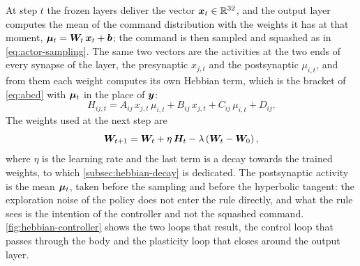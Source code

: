 At step $t$ the frozen layers deliver the vector $\bm{x}_t \in \mathbb{R}^{32}$, and the output layer computes the mean of the command distribution with the weights it has at that moment, $\bm{\mu}_t = \bm{W}_t\, \bm{x}_t + \bm{b}$; the command is then sampled and squashed as in \eqref{eq:actor-sampling}. The same two vectors are the activities at the two ends of every synapse of the layer, the presynaptic $x_{j,t}$ and the postsynaptic $\mu_{i,t}$, and from them each weight computes its own Hebbian term, which is the bracket of \eqref{eq:abcd} with $\bm{\mu}_t$ in the place of $\bm{y}$:
\begin{equation}
H_{ij,t} = A_{ij}\, x_{j,t}\, \mu_{i,t} + B_{ij}\, x_{j,t} + C_{ij}\, \mu_{i,t} + D_{ij}.
\label{eq:hebbian-term}
\end{equation}
The weights used at the next step are
\begin{equation}
\bm{W}_{t+1} = \bm{W}_t + \eta\, \bm{H}_t - \lambda \left( \bm{W}_t - \bm{W}_0 \right),
\label{eq:hebbian-update}
\end{equation}
where $\eta$ is the learning rate and the last term is a decay towards the trained weights, to which \autoref{subsec:hebbian-decay} is dedicated. The postsynaptic activity is the mean $\bm{\mu}_t$, taken before the sampling and before the hyperbolic tangent: the exploration noise of the policy does not enter the rule directly, and what the rule sees is the intention of the controller and not the squashed command. \autoref{fig:hebbian-controller} shows the two loops that result, the control loop that passes through the body and the plasticity loop that closes around the output layer.

